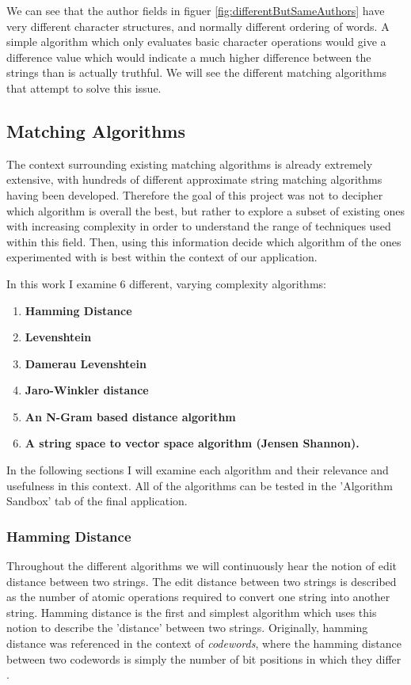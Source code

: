 \documentclass[a4paper,11pt]{article}
\begin{document}
We can see that the author fields in figuer \ref{fig:differentButSameAuthors} have very different character structures, and normally different ordering of words. A simple algorithm which only evaluates basic character operations would give a difference value which would indicate a much higher difference between the strings than is actually truthful. We will see the different matching algorithms that attempt to solve this issue.

\subsection{Matching Algorithms}
The context surrounding existing matching algorithms is already extremely extensive, with hundreds of different approximate string matching algorithms having been developed. Therefore the goal of this project was not to decipher which algorithm is overall the best, but rather to explore a subset of existing ones with increasing complexity in order to understand the range of techniques used within this field. Then, using this information decide which algorithm of the ones experimented with is best within the context of our application.

In this work I examine 6 different, varying complexity algorithms:
\begin{enumerate}
    \item \textbf{Hamming Distance}
    \item \textbf{Levenshtein}
    \item \textbf{Damerau Levenshtein}
    \item \textbf{Jaro-Winkler distance }
    \item \textbf{An N-Gram based distance algorithm}
    \item \textbf{A string space to vector space algorithm (Jensen Shannon).}
\end{enumerate}

In the following sections I will examine each algorithm and their relevance and usefulness in this context. All of the algorithms can be tested in the 'Algorithm Sandbox' tab of the final application.

\subsubsection{Hamming Distance}
Throughout the different algorithms we will continuously hear the notion of edit distance between two strings. The edit distance between two strings is described as the number of atomic operations required to convert one string into another string. Hamming distance is the first and simplest algorithm which uses this notion to describe the 'distance' between two strings. Originally, hamming distance was referenced in the context of \textit{codewords}, where the hamming distance between two codewords is simply the number of bit positions in which they differ \citep{hammingDefinition}. 
\end{document}
